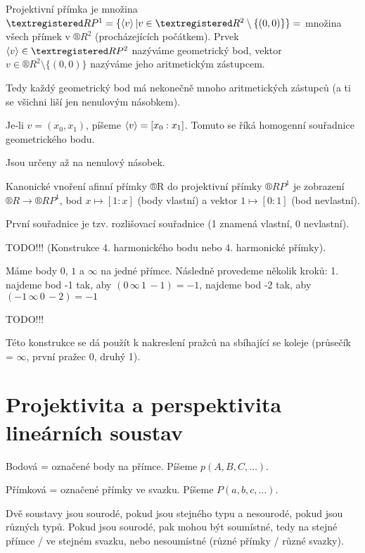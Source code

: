 \documentclass[12pt]{article}					%
\begin{document}
\begin{definice}
	Projektivní přímka je množina $®RP^1 = \{\<v\> | v \in ®R^2 \setminus \{(0, 0)\}\} =$ množina všech přímek v $®R^2$ (procházejících počátkem). Prvek $\<v\> \in ®RP^2$ nazýváme geometrický bod, vektor $v \in ®R^2 \setminus \{(0, 0)\}$ nazýváme jeho aritmetickým zástupcem.

	\begin{poznamkain}
		Tedy každý geometrický bod má nekonečně mnoho aritmetických zástupců (a ti se všichni liší jen nenulovým násobkem).
	\end{poznamkain}

	Je-li $v = (x_0, x_1)$, píšeme $\left\langle v\right\rangle = [x_0:x_1]$. Tomuto se říká homogenní souřadnice geometrického bodu.

	\begin{poznamkain}
		Jsou určeny až na nenulový násobek.
	\end{poznamkain}
\end{definice}

\begin{definice}
	Kanonické vnoření afinní přímky ®R do projektivní přímky $®RP^1$ je zobrazení $®R \rightarrow ®RP^1$, bod $x \mapsto [1:x]$ (body vlastní) a vektor $1 \mapsto [0:1]$ (bod nevlastní).

	První souřadnice je tzv. rozlišovací souřadnice (1 znamená vlastní, 0 nevlastní).
\end{definice}


TODO!!! (Konstrukce 4. harmonického bodu nebo 4. harmonické přímky).


\begin{definice}
	Máme body $0$, $1$ a $∞$ na jedné přímce. Následně provedeme několik kroků: 1. najdeme bod -1 tak, aby $(0\, ∞\, 1\, -1) = -1$, najdeme bod -2 tak, aby $(-1\, ∞\, 0\, -2) = -1$
\end{definice}

TODO!!!

\begin{poznamka}
	Této konstrukce se dá použít k nakreslení pražců na sbíhající se koleje (průsečík = $∞$, první pražec 0, druhý 1).
\end{poznamka}

\section{Projektivita a perspektivita lineárních soustav}
\begin{definice}[Soustava]
	Bodová = označené body na přímce. Píšeme $p(A, B, C, …)$.

	Přímková = označené přímky ve svazku. Píšeme $P(a, b, c, …)$.

	Dvě soustavy jsou sourodé, pokud jsou stejného typu a nesourodé, pokud jsou různých typů. Pokud jsou sourodé, pak mohou být soumístné, tedy na stejné přímce / ve stejném svazku, nebo nesoumístné (různé přímky / různé svazky).
\end{definice}
\end{document}
